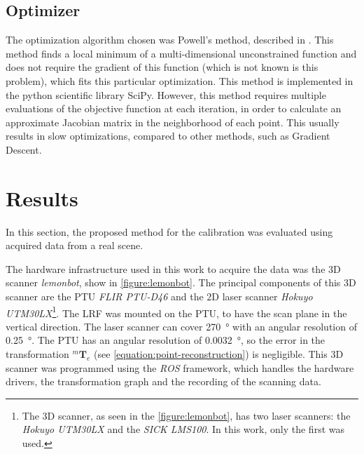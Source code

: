 \documentclass[conference]{IEEEtran}
\begin{document}
\subsection{Optimizer}

The optimization algorithm chosen was Powell's method, described in \cite{powell64}. This method finds a local minimum of a multi-dimensional unconstrained function and does not require the gradient of this function (which is not known is this problem), which fits this particular optimization. This method is implemented in the python scientific library SciPy. However, this method requires multiple evaluations of the objective function at each iteration, in order to calculate an approximate Jacobian matrix in the neighborhood of each point. This usually results in slow optimizations, compared to other methods, such as Gradient Descent.

\section{Results}
\label{section:results}

In this section, the proposed method for the calibration was evaluated using acquired data from a real scene. 

The hardware infrastructure used in this work to acquire the data was the 3D scanner \textit{lemonbot}, show in \cref{figure:lemonbot}. The principal components of this 3D scanner are the PTU \textit{FLIR PTU-D46} and the 2D laser scanner \textit{Hokuyo UTM30LX}\footnote{The 3D scanner, as seen in the \cref{figure:lemonbot}, has two laser scanners: the \textit{Hokuyo UTM30LX} and the \textit{SICK LMS100}. In this work, only the first was used.}. The LRF was mounted on the PTU, to have the scan plane in the vertical direction. The laser scanner can cover \SI{270}{\degree} with an angular resolution of \SI{0.25}{\degree}. The PTU has an angular resolution of \SI{0.0032}{\degree}, so the error in the transformation $^{m}\mathbf{T}_{e}$ (see \cref{equation:point-reconstruction}) is negligible. This 3D scanner was programmed using the \textit{ROS} framework, which handles the hardware drivers, the transformation graph and the recording of the scanning data.
\end{document}
